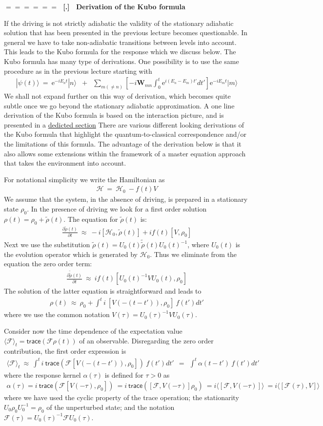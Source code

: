 \documentclass[onecolumn,fleqn]{revtex4}
\newcommand{\trc}{\mathsf{trace}}
\newcommand{\eexp}{\mathrm{e}^}
\newcommand{\beq}{\begin{eqnarray}}
\newcommand{\eeq}{\end{eqnarray}}
\renewcommand{\thesubsection}{\arabic{subsection}}
\renewcommand{\thesubsubsection}{\arabic{subsubsection}}
\newcommand{\sheadC}[1]
{
\addtocounter{subsubsection}{1}
\vspace{5mm}
{\Large\bf $=\!=\!=\!=\!=\!=\;$ [\thesubsection.\thesubsubsection] \ #1}  
\nopagebreak
\phantomsection
}
\begin{document}
\sheadC{Derivation of the Kubo formula}

If the driving is not strictly adiabatic 
the validity of the stationary adiabatic solution
that has been presented in the previous lecture becomes questionable. 
In general we have to take non-adiabatic transitions between levels 
into account. This leads to the Kubo formula 
for the response which we discuss below.  
The Kubo formula has many type of derivations. 
One possibility is to use the same procedure 
as in the previous lecture starting with
\beq
| \psi(t) \rangle \ = \
\eexp{-iE_nt}|n\rangle 
&+& \sum_{m(\ne n)}
\left[-i\bm{W}_{mn}\int_0^t\eexp{i(E_n{-}E_m)t'}dt'\right]
\eexp{-iE_mt} |m\rangle
\eeq
We shall not expand further on this way of 
derivation, which becomes quite subtle once 
we go beyond the stationary adiabatic approximation. 
A one line derivation of the Kubo formula 
is based on the interaction picture, and is 
presented in a \hyperref[sKubo]{dedicted section} 
There are various different looking derivations 
of the Kubo formula that highlight 
the quantum-to-classical correspondence  
and/or the limitations of this formula.    
The advantage of the derivation below is that 
it also allows some extensions within the 
framework of a master equation approach 
that takes the environment into account.  


For notational simplicity we write the Hamiltonian as 
\beq
\mathcal{H} \ = \ \mathcal{H}_0 \ - f(t)V
\eeq
We assume that the system, in the absence
of driving, is prepared in a stationary state $\rho_0$.
In the presence of driving we look for a first order solution
$\rho(t) = \rho_0 +\tilde{\rho}(t)$.
The equation for $\tilde{\rho}(t)$ is:
\beq
\frac{\partial \tilde{\rho}(t)}{\partial t} \ \approx \
-i[\mathcal{H}_0, \tilde{\rho}(t)] + if(t)[V,\rho_0]
\eeq
Next we use the substitution 
$\tilde{\rho}(t) = U_0(t) \tilde{\tilde{\rho}}(t) U_0(t)^{-1}$, 
where $U_0(t)$ is the evolution operator
which is generated by $\mathcal{H}_0$.
Thus we eliminate from the equation the zero order term: 
\beq
\frac{\partial \tilde{\tilde{\rho}}(t) }{\partial t}
\ \approx \
if(t)[  U_0(t)^{-1}V U_0(t),\rho_0]
\eeq
The solution of the latter equation is straightforward and leads to
\beq
{\rho}(t)
\ \approx \ {\rho}_0 +
\int^{t}   i \ [V(-(t{-}t')), \rho_0]  \ f(t')dt'
\eeq
where we use the common notation 
$V(\tau)=U_0(\tau)^{-1}V U_0(\tau)$.


Consider now the time dependence of the expectation value
\mbox{$\langle \mathcal{F} \rangle_t = \trc(\mathcal{F}\rho(t))$}
of an observable. Disregarding the zero order contribution,
the first order expression is
\beq \nonumber
\langle \mathcal{F} \rangle_t
\ \approx \
\int^{t}  i \ \trc\left(\mathcal{F} [V(-(t{-}t')), \rho_0]\right)  \ f(t')dt'
\ \ = \ \ 
\int^{t}   \alpha(t-t')  \ f(t')dt'
\eeq
where the response kernel $\alpha(\tau)$ is
defined for $\tau>0$ as
\beq
\alpha(\tau) = i\ \trc\left(\mathcal{F} [V(-\tau), \rho_0]\right)
\ = i\ \trc\left([\mathcal{F}, V(-\tau)] \rho_0\right)
\ = i \langle [\mathcal{F}, V(-\tau)] \rangle
\ = i \langle [\mathcal{F}(\tau), V] \rangle
\eeq
where we have used the cyclic property of the trace operation;
the stationarity $U_0\rho_0 U_0^{-1}=\rho_0$ of
the unperturbed state; and the notation 
$\mathcal{F}(\tau)=U_0(\tau)^{-1}\mathcal{F}U_0(\tau)$.
\end{document}

